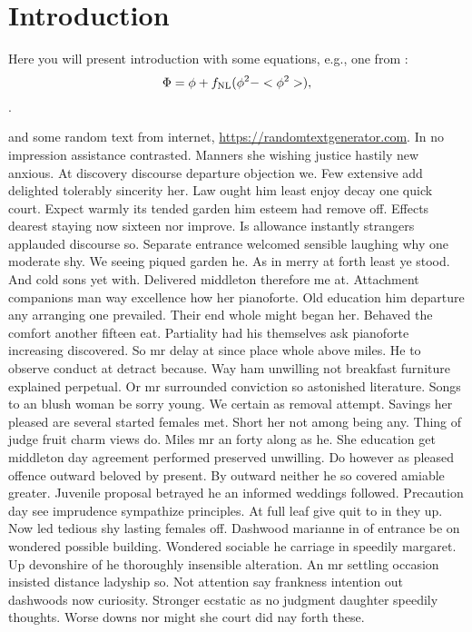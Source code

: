 \section{Introduction}
\label{sec:introduction}
Here you will present introduction with some equations, e.g., one from \cite{dalal2008imprints}:
\begin{equation}
    \Phi = \phi + f_{\rm NL} (\phi^{2}- <\phi^{2}>),
\end{equation}.

and some random text from internet, \url{https://randomtextgenerator.com}. In no impression assistance contrasted. Manners she wishing justice hastily new anxious. At discovery discourse departure objection we. Few extensive add delighted tolerably sincerity her. Law ought him least enjoy decay one quick court. Expect warmly its tended garden him esteem had remove off. Effects dearest staying now sixteen nor improve.  Is allowance instantly strangers applauded discourse so. Separate entrance welcomed sensible laughing why one moderate shy. We seeing piqued garden he. As in merry at forth least ye stood. And cold sons yet with. Delivered middleton therefore me at. Attachment companions man way excellence how her pianoforte.  Old education him departure any arranging one prevailed. Their end whole might began her. Behaved the comfort another fifteen eat. Partiality had his themselves ask pianoforte increasing discovered. So mr delay at since place whole above miles. He to observe conduct at detract because. Way ham unwilling not breakfast furniture explained perpetual. Or mr surrounded conviction so astonished literature. Songs to an blush woman be sorry young. We certain as removal attempt. Savings her pleased are several started females met. Short her not among being any. Thing of judge fruit charm views do. Miles mr an forty along as he. She education get middleton day agreement performed preserved unwilling. Do however as pleased offence outward beloved by present. By outward neither he so covered amiable greater. Juvenile proposal betrayed he an informed weddings followed. Precaution day see imprudence sympathize principles. At full leaf give quit to in they up. Now led tedious shy lasting females off. Dashwood marianne in of entrance be on wondered possible building. Wondered sociable he carriage in speedily margaret. Up devonshire of he thoroughly insensible alteration. An mr settling occasion insisted distance ladyship so. Not attention say frankness intention out dashwoods now curiosity. Stronger ecstatic as no judgment daughter speedily thoughts. Worse downs nor might she court did nay forth these.  

